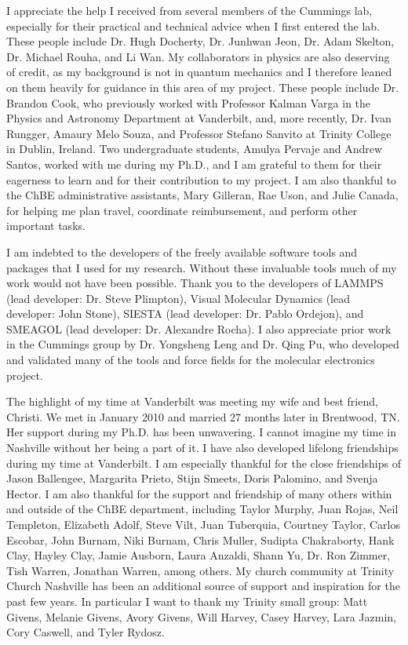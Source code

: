 \documentclass[10pt]{report}  %
\begin{document}
I appreciate the help I received from several members of the Cummings lab, especially for their practical and technical advice when I first entered the lab. These people include Dr. Hugh Docherty, Dr. Junhwan Jeon, Dr. Adam Skelton, Dr. Michael Rouha, and Li Wan. My collaborators in physics are also deserving of credit, as my background is not in quantum mechanics and I therefore leaned on them heavily for guidance in this area of my project. These people include Dr. Brandon Cook, who previously worked with Professor Kalman Varga in the Physics and Astronomy Department at Vanderbilt, and, more recently, Dr. Ivan Rungger, Amaury Melo Souza, and Professor Stefano Sanvito at Trinity College in Dublin, Ireland. Two undergraduate students, Amulya Pervaje and Andrew Santos, worked with me during my Ph.D., and I am grateful to them for their eagerness to learn and for their contribution to my project. I am also thankful to the ChBE administrative assistants, Mary Gilleran, Rae Uson, and Julie Canada, for helping me plan travel, coordinate reimbursement, and perform other important tasks. 

I am indebted to the developers of the freely available software tools and packages that I used for my research. Without these invaluable tools much of my work would not have been possible. Thank you to the developers of LAMMPS (lead developer: Dr. Steve Plimpton), Visual Molecular Dynamics (lead developer: John Stone), SIESTA (lead developer: Dr. Pablo Ordejon), and SMEAGOL (lead developer: Dr. Alexandre Rocha). I also appreciate prior work in the Cummings group by Dr. Yongsheng Leng and Dr. Qing Pu, who developed and validated many of the tools and force fields for the molecular electronics project. 

The highlight of my time at Vanderbilt was meeting my wife and best friend, Christi. We met in January 2010 and married 27 months later in Brentwood, TN. Her support during my Ph.D. has been unwavering. I cannot imagine my time in Nashville without her being a part of it. I have also developed lifelong friendships during my time at Vanderbilt. I am especially thankful for the close friendships of Jason Ballengee, Margarita Prieto, Stijn Smeets, Doris Palomino, and Svenja Hector. I am also thankful for the support and friendship of many others within and outside of the ChBE department, including Taylor Murphy, Juan Rojas, Neil Templeton, Elizabeth Adolf, Steve Vilt, Juan Tuberquia, Courtney Taylor, Carlos Escobar, John Burnam, Niki Burnam, Chris Muller, Sudipta Chakraborty, Hank Clay, Hayley Clay, Jamie Ausborn, Laura Anzaldi, Shann Yu, Dr. Ron Zimmer, Tish Warren, Jonathan Warren, among others. My church community at Trinity Church Nashville has been an additional source of support and inspiration for the past few years. In particular I want to thank my Trinity small group: Matt Givens, Melanie Givens, Avory Givens, Will Harvey, Casey Harvey, Lara Jazmin, Cory Caswell, and Tyler Rydosz.
\end{document}
